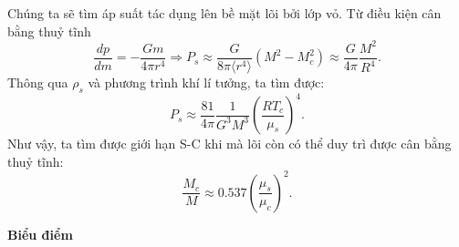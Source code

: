 \begin{enumerate}
Chúng ta sẽ tìm áp suất tác dụng lên bề mặt lõi bởi lớp vỏ.
Từ điều kiện cân bằng thuỷ tĩnh
\begin{equation}
    \dfrac{dp}{dm}=-\dfrac{Gm}{4\pi r^4} \Longrightarrow P_s \approx \dfrac{G}{8\pi\langle r^4 \rangle} (M^2-M_c^2) \approx \dfrac{G}{4\pi} \dfrac{M^2}{R^4} .
\end{equation}
Thông qua $\rho_s$ và phương trình khí lí tưởng, ta tìm được:
\begin{equation}
    P_s \approx \dfrac{81}{4\pi}\dfrac{1}{G^3M^3}\left(\dfrac{RT_c}{\mu_s}\right)^4 .\label{eq_24_12}
\end{equation}
Như vậy, ta tìm được giới hạn S-C khi mà lõi còn có thể duy trì được cân bằng thuỷ tĩnh:
\begin{equation}
    \dfrac{M_c}{M} \approx 0.537 \left(\dfrac{\mu_s}{\mu_c}\right)^2 .\label{eq_25_12}
\end{equation}

\end{enumerate}
\textbf{Biểu điểm}
